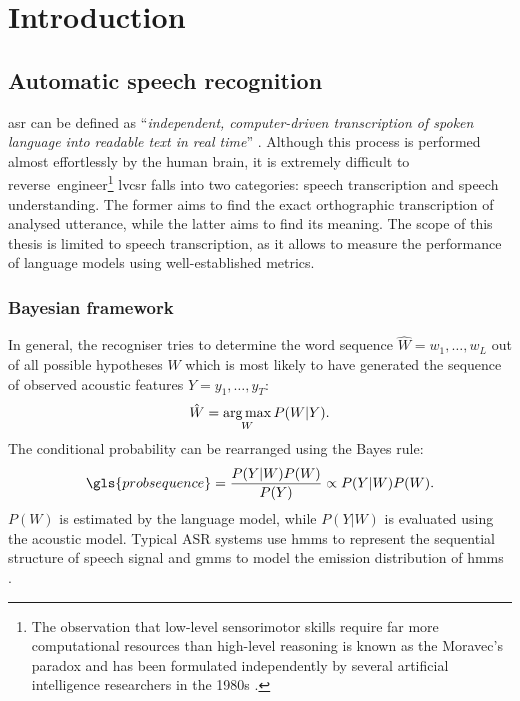 \chapter{Introduction}
\label{chapter:intro}

\section{Automatic speech recognition}
\label{section:asr}
\Gls{asr} can be defined as \enquote{\textit{independent, computer-driven transcription of spoken language into readable text in real time}} \cite{stuckless1994developments, jelinek1997statistical}. Although this process is performed almost effortlessly by the human brain, it is extremely difficult to reverse~engineer\footnote{The observation that low-level sensorimotor skills require far more computational resources than high-level reasoning is known as the Moravec's paradox and has been formulated independently by several artificial intelligence researchers in the 1980s \cite{moravec1988mind}.} \Gls{lvcsr} falls into two categories: speech transcription and speech understanding. The former aims to find the exact orthographic transcription of analysed utterance, while the latter aims to find its meaning. The scope of this thesis is limited to speech transcription, as it allows to measure the performance of language models using well-established metrics.

\subsection{Bayesian framework}
\label{subsection:bayesian}
In general, the recogniser tries to determine the word sequence $\hat{W}=w_{1}, \ldots, w_{L}$ out of all possible hypotheses $W$ which is most likely to have generated the sequence of observed acoustic features $Y=y_{1}, \ldots, y_{T}$:
\begin{equation}
\label{equation:recogniser}
  \hat{W}=\operatorname*{arg\, max}_{W}P(W|Y).
\end{equation}
The conditional probability can be rearranged using the Bayes rule:
\begin{equation}
  \label{equation:bayesian}
  \gls{probsequence}=\frac{P(Y|W)P(W)}{P(Y)}\propto{P(Y|W)P(W)}.
\end{equation}
$P(W)$ is estimated by the language model, while $P(Y|W)$ is evaluated using the acoustic model. Typical ASR systems use \glspl{hmm} to represent the sequential structure of speech signal and \glspl{gmm} to model the emission distribution of \glspl{hmm} \cite{baker1975dragon, bourlard1994connectionist}.

